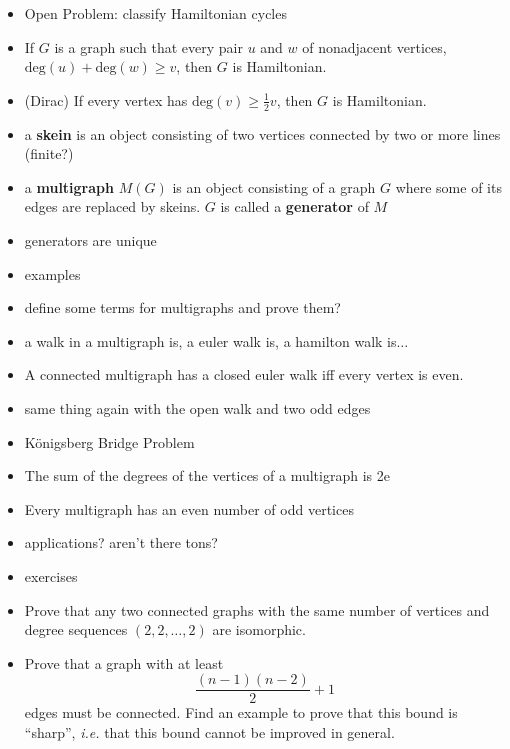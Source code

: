 \begin{itemize}
    \item Open Problem: classify Hamiltonian cycles

    \item If $G$ is a graph such that every pair $u$ and $w$ of nonadjacent vertices, $\text{deg}(u) + \text{deg}(w) \geq v$, then $G$ is Hamiltonian.
    \item (Dirac) If every vertex has $\text{deg}(v) \geq \frac{1}{2}v$, then $G$ is Hamiltonian.


    \item a \textbf{skein} is an object consisting of two vertices connected by two or more lines (finite?)
    \item a \textbf{multigraph} $M(G)$ is an object consisting of a graph $G$ where some of its edges are replaced by skeins.  $G$ is called a \textbf{generator} of $M$
    \item generators are unique
    \item examples
    \item define some terms for multigraphs and prove them?
    \item a walk in a multigraph is, a euler walk is, a hamilton walk is$\ldots$
    \item A connected multigraph has a closed euler walk iff every vertex is even.
    \item same thing again with the open walk and two odd edges
    \item K\"{o}nigsberg Bridge Problem
    \item The sum of the degrees of the vertices of a multigraph is 2e
    \item Every multigraph has an even number of odd vertices
    \item applications?  aren't there tons?
    \item exercises

    \item Prove that any two connected graphs with the same number of vertices and degree sequences $(2, 2, \ldots, 2)$ are isomorphic.

    \item Prove that a graph with at least
    $$\frac{(n-1)(n-2)}{2} +1$$
    edges must be connected.  Find an example to prove that this bound is ``sharp'', \textit{i.e.} that this bound cannot be improved in general.
\end{itemize}
